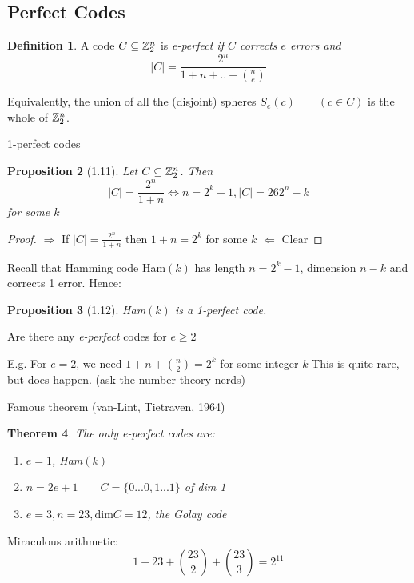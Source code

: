 \documentclass[]{amsart}
\newtheorem{thm}{Theorem}[section]
\newtheorem{prop}[thm]{Proposition}
\theoremstyle{definition}
\newtheorem{defn}[thm]{Definition}
\theoremstyle{remark}
\numberwithin{equation}{section}
\begin{document}
\subsection{Perfect Codes}
\begin{defn}
	A code $C \subseteq \mathbb{Z}_2^n$ is  \em{e-perfect} if $C$ corrects $e$ errors and \newline
	\[
	|C| = \frac{2^n}{1 + n + .. + {n \choose e}}
	\]

	Equivalently, the union of all the (disjoint) spheres $S_e(c)\qquad (c\in C)$ is the whole of $\mathbb{Z}_2^n$.
\end{defn}

1-perfect codes

\begin{prop}[1.11]
	Let $C \subseteq \mathbb{Z}_2^n$. Then \newline
	\[
		|C| = \frac{2^n}{1+n} \iff n=2^k-1, |C| =26 2^n-k 
	\]
	for some $k$
\end{prop}

\begin{proof}
	
	$\Rightarrow$ \newline
	If $|C| = \frac{2^n}{1+n}$ then $1 +n = 2^k$ for some $k$ \newline
	$\Leftarrow$ Clear
\end{proof}

Recall that Hamming code Ham$(k)$ has length $n= 2^k-1$, dimension $n-k$ and corrects 1 error. Hence: \newline

\begin{prop}[1.12]
	Ham$(k)$ is a 1-perfect code.
\end{prop}

Are there any \emph{e-perfect} codes for $e\geq2$

E.g.\newline
For $e=2$, we need $1+n + {n \choose 2} = 2^k$ for some integer $k$ \newline
This is quite rare, but does happen. (ask the number theory nerds)
\par
Famous theorem (van-Lint, Tietraven, 1964)

\begin{thm}
The only \emph{e-perfect} codes are:
	\begin{enumerate}
		\item $e=1$, Ham$(k)$
		\item $n=2e+1\qquad C=\{0 ... 0, 1 ... 1\}$ of dim 1
		\item $e=3, n=23, \text{dim}C = 12$, the \em{Golay code}
	\end{enumerate}

\end{thm}
Miraculous arithmetic:\newline
\[
	1 + 23 + {23 \choose 2} + {23 \choose 3} = 2^{11}
\]
\end{document}
